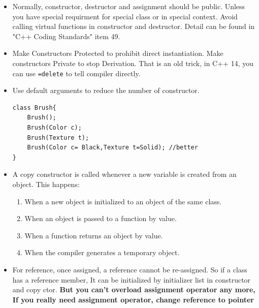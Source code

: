 \documentclass[a4paper,11pt,twoside]{book}
\begin{document}
\begin{itemize}
	\item Normally, constructor, destructor and assignment should be public. Unless you have special requirment for special class or in special context. Avoid calling virtual functions in constructor and destructor. Detail can be found in "C++ Coding Standards" item 49.
	
	\item Make Constructors Protected to prohibit direct instantiation. Make constructors Private to stop Derivation. That is an old trick, in C++ 14, you can use \texttt{=delete} to tell compiler directly.
	
	\item Use default arguments to reduce the number of constructor.
\begin{lstlisting}[numbers=none]
class Brush{
	Brush();
	Brush(Color c);
	Brush(Texture t);
	Brush(Color c= Black,Texture t=Solid); //better
}
\end{lstlisting}
		
		\item A copy constructor is called whenever a new variable is created from an object. This happens:
		
		\begin{enumerate}
			\item When a new object is initialized to an object of the same class.
			\item When an object is passed to a function by value.
			\item When a function returns an object by value.
			\item When the compiler generates a temporary object.
		\end{enumerate}
				
		\item For reference, once assigned, a reference cannot be re-assigned. So if a class has a reference member, It can be initialized by initializer list in constructor and copy ctor. \textbf{But you can't overload assignment operator any more, If you really need assignment operator, change reference to pointer}
		
\end{itemize}
\end{document}
